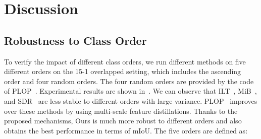 \documentclass[10pt,twocolumn,letterpaper]{article}
\begin{document}
\section{Discussion}\label{sec:discussion}
\subsection{Robustness to Class Order}
To verify the impact of different class orders,
we run different methods on five different orders on the 15-1 overlapped setting,
which includes the ascending order and four random orders.
The four random orders are provided by the code of PLOP~\cite{plop}.
Experimental results are shown in~. We can observe that ILT~\cite{ilt}, MiB~\cite{mib}, and SDR~\cite{sdr} are less stable to different orders with large variance. PLOP~\cite{plop} improves over these methods by using multi-scale feature distillations. Thanks to the proposed mechanisms, Ours is much more robust to different orders and also obtains the best performance in terms of mIoU. 
The five orders are defined as:

    
\end{document}
